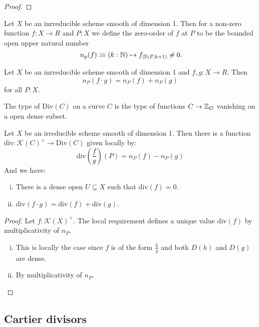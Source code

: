 \begin{proof}
\end{proof}

\begin{definition}
  Let $X$ be an inrreducible scheme smooth of dimension 1.
  Then for a non-zero function $f:X\to R$ and $P:X$ we define the zero-order of $f$ at $P$ to be
  the bounded open upper natural number
  \[
  n_p(f)\colonequiv (k:\N)\mapsto f_{\mid \D(P,k+1)}\neq 0
  \rlap{.}
  \]
\end{definition}

\begin{lemma}
  Let $X$ be an inrreducible scheme smooth of dimension 1 and $f,g:X\to R$.
  Then
  \[
  n_P(f\cdot g)=n_P( f) + n_P (g)
  \]
  for all $P:X$.
\end{lemma}


\begin{definition}
  The type of  $\mathrm{Div}(C)$ on a curve $C$ is
  the type of functions $C\to \mathbb{Z}_{\mathcal O}$ vanishing on a open dense subset.
\end{definition}

\begin{theorem}
  Let $X$ be an irreducible scheme smooth of dimension 1.
  Then there is a function $\mathrm{div}:\mathcal K(C)^\times \to \mathrm{Div}(C)$ given locally by:
  \[
  \mathrm{div}(\frac{f}{g})(P)=n_P(f)-n_P(g)
  \]
  And we have:
  \begin{enumerate}[(i)]
  \item There is a dense open $U\subseteq X$ such that $\mathrm{div}(f)=0$.
  \item $\mathrm{div}(f\cdot g)=\mathrm{div}(f)+\mathrm{div}(g)$.
  \end{enumerate}
\end{theorem}

\begin{proof}
  Let $f:\mathcal K(X)^\times$.
  The local requirement defines a unique value $\mathrm{div}(f)$ by multiplicativity of $n_P$.
  \begin{enumerate}[(i)]
  \item This is locally the case since $f$ is of the form $\frac{h}{g}$ and both $D(h)$ and $D(g)$ are dense.
  \item By multiplicativity of $n_P$.
  \end{enumerate}
\end{proof}

\subsection{Cartier divisors}
